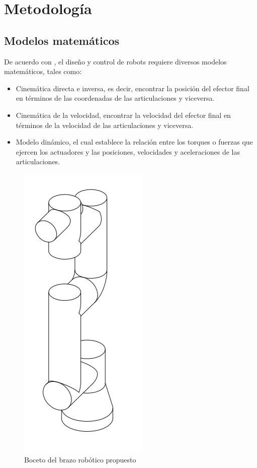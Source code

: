 \chapter{Metodología}

\section{Modelos matemáticos}

De acuerdo con \cite{Dombre2007}, el diseño y control de robots requiere diversos modelos matemáticos, tales como:

\begin{itemize}
\itemsep0em 

\item Cinemática directa e inversa, es decir, encontrar la posición del efector final en términos de las coordenadas de las articulaciones y viceversa.
\item Cinemática de la velocidad, encontrar la velocidad del efector final en términos de la velocidad de las articulaciones y viceversa.
\item Modelo dinámico, el cual establece la relación entre los torques o fuerzas que ejercen los actuadores y las posiciones, velocidades y aceleraciones de las articulaciones.
\end{itemize}

\begin{figure}
    \centering
    \includegraphics[scale=0.7]{./img/chapter3/robotarmprototype.png}
    \caption{Boceto del brazo robótico propuesto}
    \label{fig:roboticarmprototype}
\end{figure}

